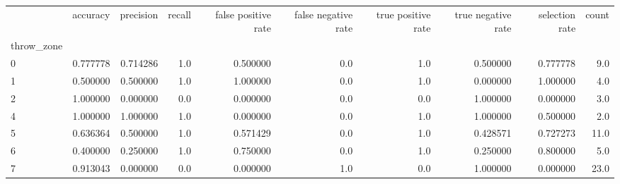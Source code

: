 \begin{tabular}{lrrrrrrrrr}
\toprule
{} &  accuracy &  precision &  recall &  false positive rate &  false negative rate &  true positive rate &  true negative rate &  selection rate &  count \\
throw\_zone &           &            &         &                      &                      &                     &                     &                 &        \\
\midrule
0          &  0.777778 &   0.714286 &     1.0 &             0.500000 &                  0.0 &                 1.0 &            0.500000 &        0.777778 &    9.0 \\
1          &  0.500000 &   0.500000 &     1.0 &             1.000000 &                  0.0 &                 1.0 &            0.000000 &        1.000000 &    4.0 \\
2          &  1.000000 &   0.000000 &     0.0 &             0.000000 &                  0.0 &                 0.0 &            1.000000 &        0.000000 &    3.0 \\
4          &  1.000000 &   1.000000 &     1.0 &             0.000000 &                  0.0 &                 1.0 &            1.000000 &        0.500000 &    2.0 \\
5          &  0.636364 &   0.500000 &     1.0 &             0.571429 &                  0.0 &                 1.0 &            0.428571 &        0.727273 &   11.0 \\
6          &  0.400000 &   0.250000 &     1.0 &             0.750000 &                  0.0 &                 1.0 &            0.250000 &        0.800000 &    5.0 \\
7          &  0.913043 &   0.000000 &     0.0 &             0.000000 &                  1.0 &                 0.0 &            1.000000 &        0.000000 &   23.0 \\
\bottomrule
\end{tabular}
